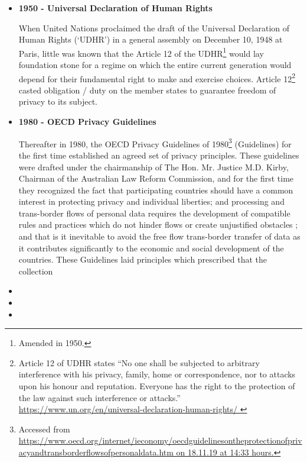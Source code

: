 \begin{multicols}{2}
\begin{itemize}

\item[{\bf 1)}] \textbf{1950 - Universal Declaration of Human Rights}

When United Nations proclaimed the draft of the Universal Declaration of Human Rights (‘UDHR’) in a general assembly on December 10, 1948 at Paris, little was known that the Article 12 of the UDHR\footnote{Amended in 1950.} would lay foundation stone for a regime on which the entire current generation would depend for their fundamental right to make and exercise choices. Article 12\footnote{Article 12 of UDHR states “No one shall be subjected to arbitrary interference with his privacy, family, home or correspondence, nor to attacks upon his honour and reputation. Everyone has the right to the protection of the law against such interference or attacks.” \url{https://www.un.org/en/universal-declaration-human-rights/ }} casted obligation / duty on the member states to guarantee freedom of privacy to its subject.

\item[{\bf 2)}] \textbf{1980 - OECD Privacy Guidelines}

Thereafter in 1980, the OECD Privacy Guidelines of 1980\footnote{Accessed from \url{https://www.oecd.org/internet/ieconomy/oecdguidelinesontheprotectionofprivacyandtransborderflowsofpersonaldata.htm on 18.11.19 at 14:33 hours.}} (Guidelines) for the first time established an agreed set of privacy principles. These guidelines were drafted under the chairmanship of The Hon. Mr. Justice M.D. Kirby, Chairman of the Australian Law Reform Commission, and for the first time they recognized the fact that participating countries should have a common interest in protecting privacy and individual liberties; and processing and trans-border flows of personal data requires the development of compatible rules and practices which do not hinder flows or create unjustified obstacles ; and that is it inevitable to avoid the free flow trans-border transfer of data as it contributes significantly to the economic and social development of the countries. These Guidelines laid principles which prescribed that the collection

\item[{\bf 1)}]

\item[{\bf 1)}]

\item[{\bf 1)}]


\end{itemize}

\end{multicols}
